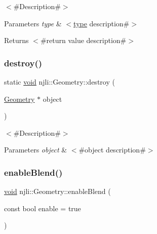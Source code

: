 $<$\#\+Description\#$>$


\begin{DoxyParams}{Parameters}
{\em type} & $<$\mbox{\hyperlink{classnjli_1_1_geometry_a144e779681b19041b60e129cbf7cac29}{type}} description\#$>$\\
\hline
\end{DoxyParams}
\begin{DoxyReturn}{Returns}
$<$\#return value description\#$>$ 
\end{DoxyReturn}
\mbox{\label{classnjli_1_1_geometry_a349dae2018bfdf9bcbec73623d45ce68}} 
\subsubsection{\texorpdfstring{destroy()}{destroy()}}
{\footnotesize\ttfamily static \mbox{\hyperlink{_thread_8h_af1e856da2e658414cb2456cb6f7ebc66}{void}} njli\+::\+Geometry\+::destroy (\begin{DoxyParamCaption}\item[{\mbox{\hyperlink{classnjli_1_1_geometry}{Geometry}} $\ast$}]{object }\end{DoxyParamCaption})\hspace{0.3cm}{\ttfamily [static]}}

$<$\#\+Description\#$>$


\begin{DoxyParams}{Parameters}
{\em object} & $<$\#object description\#$>$ \\
\hline
\end{DoxyParams}
\mbox{\label{classnjli_1_1_geometry_a12bd5b2725ed4ec11cd48d4fc365f644}} 
\subsubsection{\texorpdfstring{enable\+Blend()}{enableBlend()}}
{\footnotesize\ttfamily \mbox{\hyperlink{_thread_8h_af1e856da2e658414cb2456cb6f7ebc66}{void}} njli\+::\+Geometry\+::enable\+Blend (\begin{DoxyParamCaption}\item[{const bool}]{enable = {\ttfamily true} }\end{DoxyParamCaption})}

